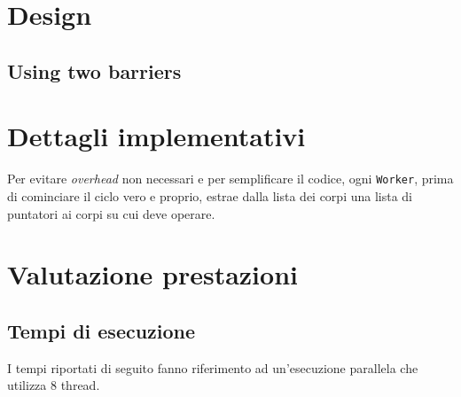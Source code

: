 \documentclass[12pt,a4paper,oneside]{article}
\begin{document}
	\section{Design}
	\subsection{Using two barriers}
	
	\section{Dettagli implementativi}
	Per evitare \textit{overhead} non necessari e per semplificare il codice, ogni \texttt{Worker}, prima di cominciare il ciclo vero e proprio, estrae dalla lista dei corpi una lista di puntatori ai corpi su cui deve operare.
	
	\section{Valutazione prestazioni}
	\subsection{Tempi di esecuzione}
	I tempi riportati di seguito fanno riferimento ad un'esecuzione parallela che utilizza 8 thread.
	
\end{document}
